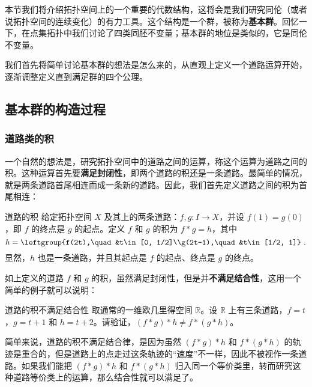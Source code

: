 
本节我们将介绍拓扑空间上的一个重要的代数结构，这将会是我们研究同伦（或者说拓扑空间的连续变化）的有力工具。这个结构是一个群，被称为\textbf{基本群}。回忆一下，在点集拓扑中我们讨论了四类同胚不变量；基本群的地位是类似的，它是同伦不变量。

我们首先将简单讨论基本群的想法是怎么来的，从直观上定义一个道路运算开始，逐渐调整定义直到满足群的四个公理。

\subsection{基本群的构造过程}
\subsubsection{道路类的积}

一个自然的想法是，研究拓扑空间中的道路之间的运算，称这个运算为道路之间的积。这种运算首先要\textbf{满足封闭性}，即两个道路的积还是一条道路。最简单的情况，就是两条道路首尾相连而成一条新的道路。因此，我们首先定义道路之间的积为首尾相连：

\begin{definition}{道路的积}\label{def_HomT3_1}
给定拓扑空间 $X$ 及其上的两条道路：$f, g:I\rightarrow X$，并设 $f(1)=g(0)$，即 $f$ 的终点是 $g$ 的起点。定义 $f$ 和 $g$ 的积为 $f*g=h$，其中\begin{equation}h=\leftgroup{f(2t),\quad &t\in[0, 1/2]\\g(2t-1),\quad &t\in[1/2, 1]}~.\end{equation}
显然，$h$ 也是一条道路，并且其起点是 $f$ 的起点、终点是 $g$ 的终点。
\end{definition}

如上定义的道路 $f$ 和 $g$ 的积，虽然满足封闭性，但是并\textbf{不满足结合性}，这用一个简单的例子就可以说明：

\begin{exercise}{道路的积不满足结合性}
取通常的一维欧几里得空间 $\mathbb{R}$。设 $\mathbb{R}$ 上有三条道路，$f=t$，$g=t+1$ 和 $h=t+2$。请验证，$(f*g)*h\not=f*(g*h)$。
\end{exercise}

简单来说，道路的积不满足结合律，是因为虽然 $(f*g)*h$ 和 $f*(g*h)$ 的轨迹是重合的，但是道路上的点走过这条轨迹的“速度”不一样，因此不被视作一条道路。如果我们能把 $(f*g)*h$ 和 $f*(g*h)$ 归入同一个等价类里，转而研究这种道路等价类上的运算，那么结合性就可以满足了。

